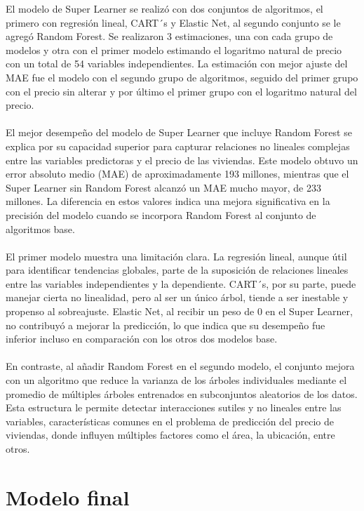 \documentclass[article,11 pt]{article}
\begin{document}
El modelo de Super Learner se realizó con dos conjuntos de algoritmos, el primero con regresión lineal, CART´s y Elastic Net, al segundo conjunto se le agregó Random Forest. Se realizaron 3 estimaciones, una con cada grupo de modelos y otra con el primer modelo estimando el logaritmo natural de precio con un total de 54 variables independientes. La estimación con mejor ajuste del MAE fue el modelo con el segundo grupo de algoritmos, seguido del primer grupo con el precio sin alterar y por último el primer grupo con el logaritmo natural del precio.
\\
\\
El mejor desempeño del modelo de Super Learner que incluye Random Forest se explica por su capacidad superior para capturar relaciones no lineales complejas entre las variables predictoras y el precio de las viviendas. Este modelo obtuvo un error absoluto medio (MAE) de aproximadamente 193 millones, mientras que el Super Learner sin Random Forest alcanzó un MAE mucho mayor, de 233 millones. La diferencia en estos valores indica una mejora significativa en la precisión del modelo cuando se incorpora Random Forest al conjunto de algoritmos base.
\\
\\
El primer modelo muestra una limitación clara. La regresión lineal, aunque útil para identificar tendencias globales, parte de la suposición de relaciones lineales entre las variables independientes y la dependiente. CART´s, por su parte, puede manejar cierta no linealidad, pero al ser un único árbol, tiende a ser inestable y propenso al sobreajuste. Elastic Net, al recibir un peso de 0 en el Super Learner, no contribuyó a mejorar la predicción, lo que indica que su desempeño fue inferior incluso en comparación con los otros dos modelos base.
\\
\\
En contraste, al añadir Random Forest en el segundo modelo, el conjunto mejora con un algoritmo que reduce la varianza de los árboles individuales mediante el promedio de múltiples árboles entrenados en subconjuntos aleatorios de los datos. Esta estructura le permite detectar interacciones sutiles y no lineales entre las variables, características comunes en el problema de predicción del precio de viviendas, donde influyen múltiples factores como el área, la ubicación, entre otros.


\section{Modelo final}
\end{document}
